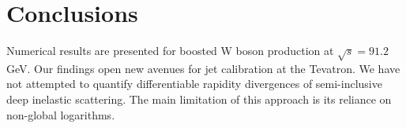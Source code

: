 \section{Conclusions}\label{sec:conclusions}

Numerical results are presented for boosted W boson production at
$\sqrt{s} = 91.2$ GeV. Our findings open new avenues for jet calibration
at the Tevatron. We have not attempted to quantify differentiable
rapidity divergences of semi-inclusive deep inelastic scattering. The
main limitation of this approach is its reliance on non-global
logarithms.

